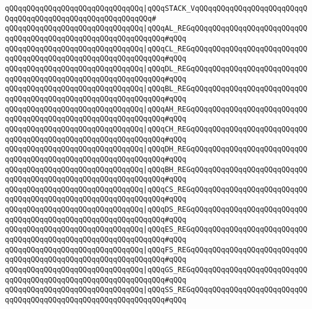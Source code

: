 \verb|qQQqqQQqqQQqqQQqqQQqqQQqqQQqqQQq|\verb#|qQQqSTACK_VqQQqqQQqqQQqqQQqqQQqqQQqqQQqqQQqqQQqqQQqqQQqqQQqqQQqqQQqqQQq#\verb|#|\newline
\verb|qQQqqQQqqQQqqQQqqQQqqQQqqQQqqQQq|\verb#|qQQqAL_REGqQQqqQQqqQQqqQQqqQQqqQQqqQQqqQQqqQQqqQQqqQQqqQQqqQQqqQQqqQQqqQQq#\verb|#qQQq|\newline
\verb|qQQqqQQqqQQqqQQqqQQqqQQqqQQqqQQq|\verb#|qQQqCL_REGqQQqqQQqqQQqqQQqqQQqqQQqqQQqqQQqqQQqqQQqqQQqqQQqqQQqqQQqqQQqqQQq#\verb|#qQQq|\newline
\verb|qQQqqQQqqQQqqQQqqQQqqQQqqQQqqQQq|\verb#|qQQqDL_REGqQQqqQQqqQQqqQQqqQQqqQQqqQQqqQQqqQQqqQQqqQQqqQQqqQQqqQQqqQQqqQQq#\verb|#qQQq|\newline
\verb|qQQqqQQqqQQqqQQqqQQqqQQqqQQqqQQq|\verb#|qQQqBL_REGqQQqqQQqqQQqqQQqqQQqqQQqqQQqqQQqqQQqqQQqqQQqqQQqqQQqqQQqqQQqqQQq#\verb|#qQQq|\newline
\verb|qQQqqQQqqQQqqQQqqQQqqQQqqQQqqQQq|\verb#|qQQqAH_REGqQQqqQQqqQQqqQQqqQQqqQQqqQQqqQQqqQQqqQQqqQQqqQQqqQQqqQQqqQQqqQQq#\verb|#qQQq|\newline
\verb|qQQqqQQqqQQqqQQqqQQqqQQqqQQqqQQq|\verb#|qQQqCH_REGqQQqqQQqqQQqqQQqqQQqqQQqqQQqqQQqqQQqqQQqqQQqqQQqqQQqqQQqqQQqqQQq#\verb|#qQQq|\newline
\verb|qQQqqQQqqQQqqQQqqQQqqQQqqQQqqQQq|\verb#|qQQqDH_REGqQQqqQQqqQQqqQQqqQQqqQQqqQQqqQQqqQQqqQQqqQQqqQQqqQQqqQQqqQQqqQQq#\verb|#qQQq|\newline
\verb|qQQqqQQqqQQqqQQqqQQqqQQqqQQqqQQq|\verb#|qQQqBH_REGqQQqqQQqqQQqqQQqqQQqqQQqqQQqqQQqqQQqqQQqqQQqqQQqqQQqqQQqqQQqqQQq#\verb|#qQQq|\newline
\verb|qQQqqQQqqQQqqQQqqQQqqQQqqQQqqQQq|\verb#|qQQqCS_REGqQQqqQQqqQQqqQQqqQQqqQQqqQQqqQQqqQQqqQQqqQQqqQQqqQQqqQQqqQQqqQQq#\verb|#qQQq|\newline
\verb|qQQqqQQqqQQqqQQqqQQqqQQqqQQqqQQq|\verb#|qQQqDS_REGqQQqqQQqqQQqqQQqqQQqqQQqqQQqqQQqqQQqqQQqqQQqqQQqqQQqqQQqqQQqqQQq#\verb|#qQQq|\newline
\verb|qQQqqQQqqQQqqQQqqQQqqQQqqQQqqQQq|\verb#|qQQqES_REGqQQqqQQqqQQqqQQqqQQqqQQqqQQqqQQqqQQqqQQqqQQqqQQqqQQqqQQqqQQqqQQq#\verb|#qQQq|\newline
\verb|qQQqqQQqqQQqqQQqqQQqqQQqqQQqqQQq|\verb#|qQQqFS_REGqQQqqQQqqQQqqQQqqQQqqQQqqQQqqQQqqQQqqQQqqQQqqQQqqQQqqQQqqQQqqQQq#\verb|#qQQq|\newline
\verb|qQQqqQQqqQQqqQQqqQQqqQQqqQQqqQQq|\verb#|qQQqGS_REGqQQqqQQqqQQqqQQqqQQqqQQqqQQqqQQqqQQqqQQqqQQqqQQqqQQqqQQqqQQqqQQq#\verb|#qQQq|\newline
\verb|qQQqqQQqqQQqqQQqqQQqqQQqqQQqqQQq|\verb#|qQQqSS_REGqQQqqQQqqQQqqQQqqQQqqQQqqQQqqQQqqQQqqQQqqQQqqQQqqQQqqQQqqQQqqQQq#\verb|#qQQq|\newline
